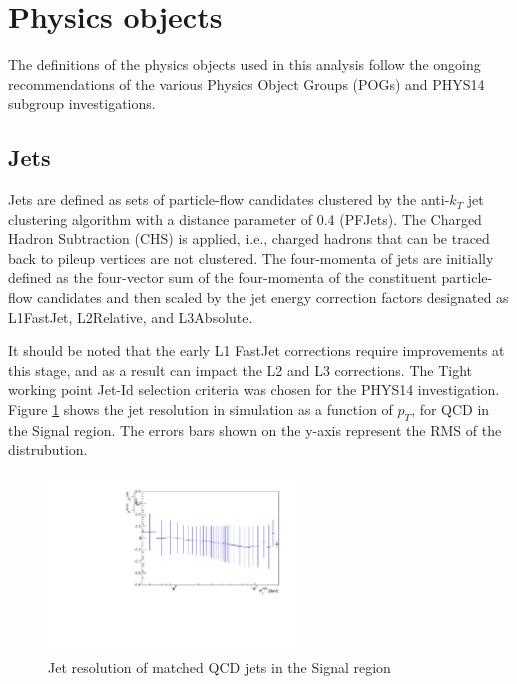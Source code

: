 \section{Physics objects}
\label{sec:objects}
The definitions of the physics objects used in this analysis follow the ongoing recommendations of the various Physics Object Groups (POGs) and PHYS14 subgroup investigations. 

\subsection{Jets}
\label{sec:jetreco}
Jets are defined as sets of particle-flow candidates clustered by the
anti-$k_{T}$ jet clustering algorithm with a distance parameter of 0.4
(PFJets). The Charged Hadron Subtraction (CHS) is applied, i.e., charged
hadrons that can be traced back to pileup vertices are not clustered.
The four-momenta of jets are initially defined as the four-vector sum of
the four-momenta of the constituent particle-flow candidates and then
scaled by the jet energy correction factors designated as L1FastJet,
L2Relative, and L3Absolute.

It should be noted that the early L1 FastJet corrections require
improvements at this stage, and as a result can impact the L2 and L3
corrections. The Tight working point Jet-Id selection criteria was
chosen for the PHYS14 investigation. Figure \ref{fig:QCDJets} shows the
jet resolution in simulation as a function of $p_{T}$, for QCD in the Signal region. The errors bars
shown on the y-axis represent the RMS of the distrubution.

\begin{figure}[h]
  \centering
  \includegraphics[width=0.6\textwidth]{figures/PhysicsObjectsPlots/JetResQCDVarBinWidthv3.pdf}
  \caption{Jet resolution of matched QCD jets in the Signal region}
  \label{fig:QCDJets}
\end{figure}
   
